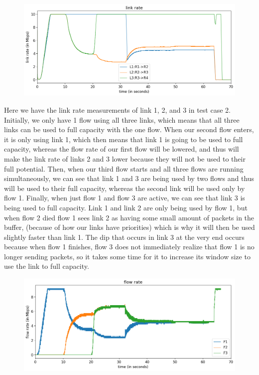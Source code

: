 \documentclass{article}
\begin{document}
\begin{figure}[H]
\centering
\includegraphics[width = \textwidth]{test_case2_fast link rate.png}
\end{figure}

Here we have the link rate measurements of link 1, 2, and 3 in test case 2. Initially, we only have 1 flow using all three links, which means that all three links can be used to full capacity with the one flow. When our second flow enters, it is only using link 1, which then means that link 1 is going to be used to full capacity, whereas the flow rate of our first flow will be lowered, and thus will make the link rate of links 2 and 3 lower because they will not be used to their full potential. Then, when our third flow starts and all three flows are running simultaneously, we can see that link 1 and 3 are being used by two flows and thus will be used to their full capacity, whereas the second link will be used only by flow 1. Finally, when just flow 1 and flow 3 are active, we can see that link 3 is being used to full capacity. Link 1 and link 2 are only being used by flow 1, but when flow 2 died flow 1 sees link 2 as having some small amount of packets in the buffer, (because of how our links have priorities) which is why it will then be used slightly faster than link 1. The dip that occurs in link 3 at the very end occurs because when flow 1 finishes, flow 3 does not immediately realize that flow 1 is no longer sending packets, so it takes some time for it to increase its window size to use the link to full capacity.

\begin{figure}[H]
\centering
\includegraphics[width = \textwidth]{test_case2_fast flow rate.png}
\end{figure}
\end{document}

